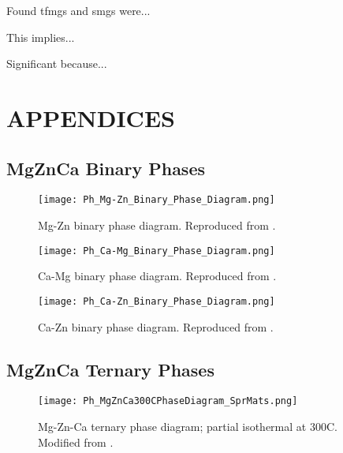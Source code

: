\documentclass[a4paper,12pt,oneside]{report}%
\begin{document}
Found \glspl{tfmg} and \glspl{smg} were...

This implies...

Significant because...







\chapter{APPENDICES}

\section{MgZnCa Binary Phases}

\begin{figure}[h]
	\centering
	\texttt{[image: Ph\_Mg-Zn\_Binary\_Phase\_Diagram.png]}
	\caption[Mg-Zn binary phase diagram.]{Mg-Zn binary phase diagram. Reproduced from \cite{Predel1997}.}
	\label{fig:MgZnDiagram}
\end{figure}

\begin{figure}[h]
	\centering
	\texttt{[image: Ph\_Ca-Mg\_Binary\_Phase\_Diagram.png]}
	\caption[Ca-Mg binary phase diagram.]{Ca-Mg binary phase diagram. Reproduced from \cite{Nayeb1987}.}
	\label{fig:CaMgDiagram}
\end{figure}

\begin{figure}[h]
	\centering
	\texttt{[image: Ph\_Ca-Zn\_Binary\_Phase\_Diagram.png]}
	\caption[Ca-Zn binary phase diagram.]{Ca-Zn binary phase diagram. Reproduced from \cite{Itkin1990}.}
	\label{fig:CaZnDiagram}
\end{figure}

\clearpage
\newpage

\section{MgZnCa Ternary Phases}

\begin{figure}[htb]
	\centering
	\texttt{[image: Ph\_MgZnCa300CPhaseDiagram\_SprMats.png]}
	\caption[Mg-Zn-Ca ternary phase diagram; partial isothermal at 300\degree C.]{Mg-Zn-Ca ternary phase diagram; partial isothermal at 300\degree C. Modified from \cite{Melnik1978}.}
	\label{fig:MgZnCa300PhaseD}
\end{figure}
\end{document}
